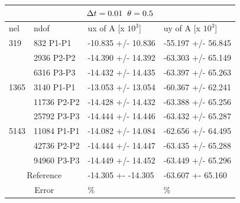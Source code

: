 \begin{table}[h!]
\centering
\label{CSM 3 Results 2}
\begin{tabular}{ |p{1cm}||p{2.7cm}|p{3.3cm}|p{3.3cm}|}
\hline
  \multicolumn{4}{|c|}{$\Delta t = 0.01 \hspace{2mm} \theta = 0.5$} \\
\hline
nel & ndof & ux of A [x $10^{3}$]  &uy of A [x $10^{3}$] \\
\hline
    319     & 832 P1-P1 & -10.835       +/-  10.836 & -55.197       +/-  56.845 \\
     & 2936 P2-P2 & -14.390       +/-  14.392 & -63.303       +/-  65.149 \\
      & 6316 P3-P3& -14.432       +/-  14.435 & -63.397       +/-  65.263 \\
    \hline
    1365    & 3140 P1-P1  & -13.053       +/-  13.054 & -60.367       +/-  62.241 \\
     & 11736 P2-P2  & -14.428       +/-  14.432 & -63.388       +/-  65.256 \\
     & 25792 P3-P3  & -14.444       +/-  14.446 & -63.432       +/-  65.287 \\
     \hline
     5143    & 11084 P1-P1 & -14.082       +/-  14.084 & -62.656       +/-  64.495 \\
     & 42736 P2-P2 & -14.444       +/-  14.447 & -63.435       +/-  65.288 \\
     & 94960 P3-P3& -14.449       +/-  14.452 & -63.449       +/-  65.296 \\
 \hline
  \multicolumn{2}{|c|}{Reference}  &-14.305 +- -14.305        & -63.607 +- 65.160    \\
   \hline
    \multicolumn{2}{|c|}{Error}  & \%   &  \%\\
   \hline
\end{tabular}
\end{table}



